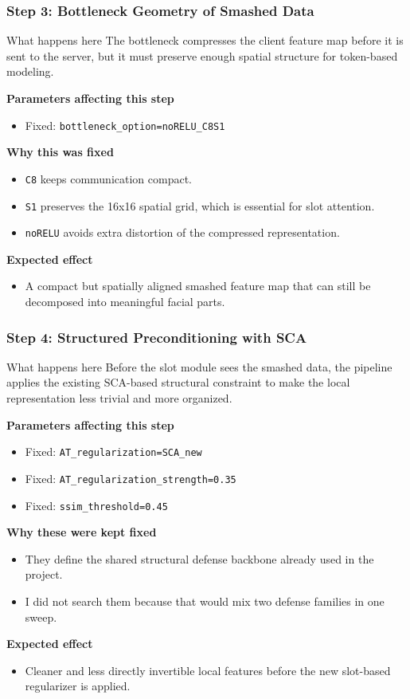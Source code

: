 \documentclass[aspectratio=169]{beamer}
\newcommand{\stepheader}[2]{
    \frametitle{Step #1: #2}
}
\begin{document}
\begin{frame}
    \stepheader{3}{Bottleneck Geometry of Smashed Data}
    \small
    \begin{block}{What happens here}
        The bottleneck compresses the client feature map before it is sent to the server, but it must preserve enough spatial structure for token-based modeling.
    \end{block}
    \textbf{Parameters affecting this step}
    \begin{itemize}
        \item Fixed: \texttt{bottleneck\_option=noRELU\_C8S1}
    \end{itemize}
    \textbf{Why this was fixed}
    \begin{itemize}
        \item \texttt{C8} keeps communication compact.
        \item \texttt{S1} preserves the 16x16 spatial grid, which is essential for slot attention.
        \item \texttt{noRELU} avoids extra distortion of the compressed representation.
    \end{itemize}
    \textbf{Expected effect}
    \begin{itemize}
        \item A compact but spatially aligned smashed feature map that can still be decomposed into meaningful facial parts.
    \end{itemize}
\end{frame}

\begin{frame}
    \stepheader{4}{Structured Preconditioning with SCA}
    \small
    \begin{block}{What happens here}
        Before the slot module sees the smashed data, the pipeline applies the existing SCA-based structural constraint to make the local representation less trivial and more organized.
    \end{block}
    \textbf{Parameters affecting this step}
    \begin{itemize}
        \item Fixed: \texttt{AT\_regularization=SCA\_new}
        \item Fixed: \texttt{AT\_regularization\_strength=0.35}
        \item Fixed: \texttt{ssim\_threshold=0.45}
    \end{itemize}
    \textbf{Why these were kept fixed}
    \begin{itemize}
        \item They define the shared structural defense backbone already used in the project.
        \item I did not search them because that would mix two defense families in one sweep.
    \end{itemize}
    \textbf{Expected effect}
    \begin{itemize}
        \item Cleaner and less directly invertible local features before the new slot-based regularizer is applied.
    \end{itemize}
\end{frame}
\end{document}

